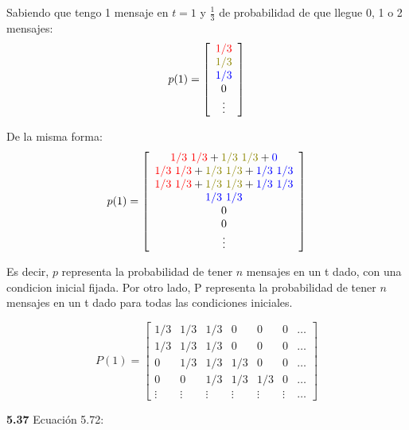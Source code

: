 Sabiendo que tengo 1 mensaje en $t=1$ y $\frac{1}{3}$ de probabilidad de que llegue 0, 1 o 2 mensajes:
\begin{equation*}
	p(1) = \left[ \begin{array}{c} \textcolor{red}{1/3} \\ \textcolor{olive}{1/3} \\ \textcolor{blue}{1/3} \\ 0 \\ \vdots \end{array} \right]
\end{equation*}

De la misma forma:
\begin{equation*}
	p(1) = \left[ \begin{array}{c}
		\textcolor{red}{1/3 \ 1/3} + \textcolor{olive}{1/3 \ 1/3} + \textcolor{blue}{0} \\
		\textcolor{red}{1/3 \ 1/3} + \textcolor{olive}{1/3 \ 1/3} + \textcolor{blue}{1/3 \ 1/3} \\
		\textcolor{red}{1/3 \ 1/3} + \textcolor{olive}{1/3 \ 1/3} + \textcolor{blue}{1/3 \ 1/3} \\
		\textcolor{blue}{1/3 \ 1/3} \\
		0 \\ 0 \\ \vdots \end{array} \right]
\end{equation*}

Es decir, $p$ representa la probabilidad de tener $n$ mensajes en un t dado, con una condicion inicial fijada. Por otro lado, P representa la probabilidad de tener $n$ mensajes en un t dado para todas las condiciones iniciales.

\begin{equation*}
	P(1) = \begin{bmatrix}
				1/3 & 1/3 & 1/3 & 0 & 0 & 0 & \hdots \\
				1/3 & 1/3 & 1/3 & 0 & 0 & 0 & \hdots \\
				0 & 1/3 & 1/3 & 1/3 & 0 & 0 & \hdots \\
				0 & 0 & 1/3 & 1/3 & 1/3 & 0 & \hdots \\
				\vdots & \vdots & \vdots & \vdots & \vdots & \vdots & \hdots
		   \end{bmatrix}
\end{equation*}

\vspace{1cm}

\textbf{5.37} Ecuación 5.72:

